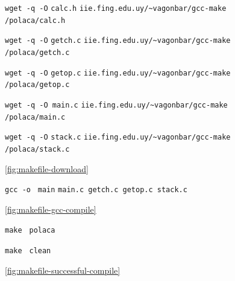 \documentclass[11pt]{article}
\newcommand{\codetext}[2]{\large\texttt{\textcolor{#1}{#2}}}
\newcommand{\imagecaption}[1]{\vspace{-7pt}\caption*{\char91\ref{fig:#1}\char93}}
\begin{document}
		
		
		
		
		\begin{figure}[H]
			\centering
			\begin{code-box}
				\codetext{light-blue}{wget }\codetext{orange-desert-vim}{-q -O} \codetext{light-red}{calc.h} \codetext{orange-desert-vim}{iie.fing.edu.uy/\textasciitilde{}vagonbar/gcc-make
				/polaca/calc.h}
				
				\codetext{light-blue}{wget }\codetext{orange-desert-vim}{-q -O} \codetext{light-red}{getch.c} \codetext{orange-desert-vim}{iie.fing.edu.uy/\textasciitilde{}vagonbar/gcc-make
				/polaca/getch.c}
				
			  	 \codetext{light-blue}{wget }\codetext{orange-desert-vim}{-q -O} \codetext{light-red}{getop.c} \codetext{orange-desert-vim}{iie.fing.edu.uy/\textasciitilde{}vagonbar/gcc-make
				/polaca/getop.c}
				
				\codetext{light-blue}{wget }\codetext{orange-desert-vim}{-q -O }\codetext{light-red}{main.c} \codetext{orange-desert-vim}{iie.fing.edu.uy/\textasciitilde{}vagonbar/gcc-make
				/polaca/main.c}
				
				\codetext{light-blue}{wget }\codetext{orange-desert-vim}{-q -O} \codetext{light-red}{stack.c} \codetext{orange-desert-vim}{iie.fing.edu.uy/\textasciitilde{}vagonbar/gcc-make
				/polaca/stack.c}
			
			\end{code-box}
			\imagecaption{makefile-download}
		\end{figure}
		
		\begin{figure}[H]
			\centering
			\begin{code-box}
				\codetext{light-blue}{gcc }\codetext{orange-desert-vim}{-o } \codetext{light-red}{main} \codetext{orange-desert-vim}{main.c getch.c getop.c stack.c}
			\end{code-box}
			\imagecaption{makefile-gcc-compile}
		\end{figure}
		
		\begin{figure}[H]
			\centering
			\begin{code-box}
				\codetext{light-blue}{make } \codetext{light-red}{polaca}\newline
                
                		\codetext{light-blue}{make } \codetext{light-red}{clean}

			\end{code-box}
			\imagecaption{makefile-successful-compile}
		\end{figure}
		
\end{document}
